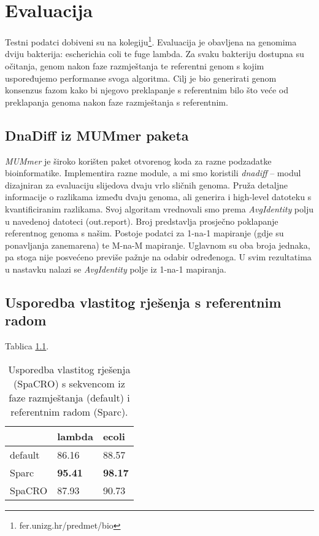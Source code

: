 \chapter{Evaluacija}
\label{sec:eval}

Testni podatci dobiveni su na kolegiju\footnote{fer.unizg.hr/predmet/bio}.
Evaluacija je obavljena na genomima dviju bakterija: escherichia coli te fuge lambda.
Za svaku bakteriju dostupna su očitanja, genom nakon faze razmještanja te referentni genom s kojim uspoređujemo performanse svoga algoritma.
Cilj je bio generirati genom konsenzus fazom kako bi njegovo preklapanje s referentnim bilo što veće od preklapanja genoma nakon faze razmještanja s referentnim.

\section{DnaDiff iz MUMmer paketa}

\emph{MUMmer} \citep{kurtz2004versatile} je široko korišten paket otvorenog koda  za razne podzadatke bioinformatike.
Implementira razne module, a mi smo koristili \emph{dnadiff} -- modul dizajniran za evaluaciju slijedova dvaju vrlo sličnih genoma.
Pruža detaljne informacije o razlikama između dvaju genoma, ali generira i high-level datoteku s kvantificiranim razlikama.
Svoj algoritam vrednovali smo prema \emph{AvgIdentity} polju u navedenoj datoteci (out.report).
Broj predstavlja prosječno poklapanje referentnog genoma s našim.
Postoje podatci za 1-na-1 mapiranje (gdje su ponavljanja zanemarena) te M-na-M mapiranje.
Uglavnom su oba broja jednaka, pa stoga nije posvećeno previše pažnje na odabir određenoga.
U svim rezultatima u nastavku nalazi se \emph{AvgIdentity} polje iz 1-na-1 mapiranja.

\section{Usporedba vlastitog rješenja s referentnim radom}

Tablica \ref{tbl:usporedba}.

\begin{table}[]
\centering
\caption{Usporedba vlastitog rješenja (SpaCRO) s sekvencom iz faze razmještanja (default) i referentnim radom (Sparc).}
\label{tbl:usporedba}
\begin{tabular}{l|ll}
  & \multicolumn{1}{l}{lambda} & ecoli \\ \hline
  default & 86.16                       & 88.57 \\
  Sparc   & \textbf{95.41}              & \textbf{98.17} \\
  SpaCRO  & 87.93                       & 90.73
\end{tabular}
\end{table}



